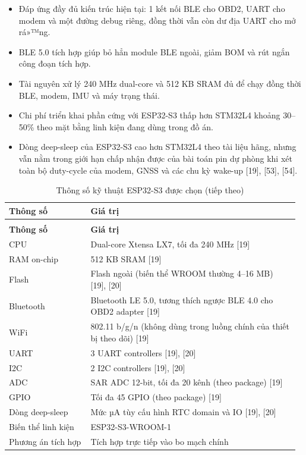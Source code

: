 \documentclass[a4paper]{extarticle}
\newcommand{\thesissettableid}[2]{%
  \renewcommand{\thetable}{#1}%
  \renewcommand{\theHtable}{#2}%
}
\providecommand{\tightlist}{%
  \setlength{\itemsep}{0pt}\setlength{\parskip}{0pt}}
\begin{document}
\begin{itemize}
\tightlist
\item
  Đáp ứng đầy đủ kiến trúc hiện tại: 1 kết nối BLE cho OBD2, UART cho
  modem và một đường debug riêng, đồng thời vẫn còn dư địa UART cho mở
  rá»™ng.
\item
  BLE 5.0 tích hợp giúp bỏ hẳn module BLE ngoài, giảm BOM và rút ngắn
  công đoạn tích hợp.
\item
  Tài nguyên xử lý 240 MHz dual-core và 512 KB SRAM đủ để chạy đồng thời
  BLE, modem, IMU và máy trạng thái.
\item
  Chi phí triển khai phần cứng với ESP32-S3 thấp hơn STM32L4 khoảng
  30--50\% theo mặt bằng linh kiện đang dùng trong đồ án.
\item
  Dòng deep-sleep của ESP32-S3 cao hơn STM32L4 theo tài liệu hãng, nhưng
  vẫn nằm trong giới hạn chấp nhận được của bài toán pin dự phòng khi xét
  toàn bộ duty-cycle của modem, GNSS và các chu kỳ wake-up {[}19{]},
  {[}53{]}, {[}54{]}.
\end{itemize}


{\thesissettableid{3.2}{tab-ch3-thong-so-ky-thuat-esp32-s3-uoc-chon}
\def\LTcaptype{table}
\begin{longtable}{|L{0.274\linewidth}|L{0.694\linewidth}|}
\caption{Thông số kỹ thuật ESP32-S3 được chọn}\label{tab:ch3-thong-so-ky-thuat-esp32-s3-uoc-chon}\\
\hline \textbf{Thông số} & \textbf{Giá trị} \\
\hline
\endfirsthead
\caption[]{Thông số kỹ thuật ESP32-S3 được chọn (tiếp theo)}\\
\hline \textbf{Thông số} & \textbf{Giá trị} \\
\hline
\endhead
\hline
\endfoot
\endlastfoot
CPU & Dual-core Xtensa LX7, tối đa 240 MHz {[}19{]} \\\hline
RAM on-chip & 512 KB SRAM {[}19{]} \\\hline
Flash & Flash ngoài (biến thể WROOM thường 4--16 MB) {[}19{]},
{[}20{]} \\\hline
Bluetooth & Bluetooth LE 5.0, tương thích ngược BLE 4.0 cho OBD2 adapter
{[}19{]} \\\hline
WiFi & 802.11 b/g/n (không dùng trong luồng chính của thiết bị theo dõi)
{[}19{]} \\\hline
UART & 3 UART controllers {[}19{]}, {[}20{]} \\\hline
I2C & 2 I2C controllers {[}19{]}, {[}20{]} \\\hline
ADC & SAR ADC 12-bit, tối đa 20 kênh (theo package) {[}19{]} \\\hline
GPIO & Tối đa 45 GPIO (theo package) {[}19{]} \\\hline
Dòng deep-sleep & Mức µA tùy cấu hình RTC domain và IO {[}19{]},
{[}20{]} \\\hline
Biến thể linh kiện & ESP32-S3-WROOM-1 \\\hline
Phương án tích hợp & Tích hợp trực tiếp vào bo mạch chính \\\hline
\end{longtable}
}
\end{document}
